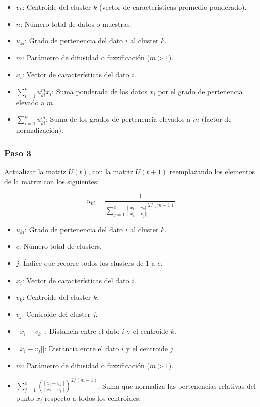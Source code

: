\documentclass[11pt, letterpaper]{article}
\begin{document}
\begin{itemize}
	\item $v_k$: Centroide del cluster $k$ (vector de características promedio ponderado).
	\item $n$: Número total de datos o muestras.
	\item $u_{ki}$: Grado de pertenencia del dato $i$ al cluster $k$.
	\item $m$: Parámetro de difusidad o fuzzificación ($m > 1$).
	\item $x_i$: Vector de características del dato $i$.
	\item $\sum_{i=1}^{n} u_{ki}^m x_i$: Suma ponderada de los datos $x_i$ por el grado de pertenencia elevado a $m$.
	\item $\sum_{i=1}^{n} u_{ki}^m$: Suma de los grados de pertenencia elevados a $m$ (factor de normalización).
\end{itemize}


\subsubsection{Paso 3}

Actualizar la matriz $U(t) $, con la matriz $U(t + 1)$ reemplazando los elementos de la matriz con los siguientes:

$$u_{ki} = \frac{1}{\sum^c_{j = 1}{\frac{||x_i-v_k||}{||x_i-v_j||}}^{2/(m-1)}}$$

\begin{itemize}
	\item $u_{ki}$: Grado de pertenencia del dato $i$ al cluster $k$.
	\item $c$: Número total de clusters.
	\item $j$: Índice que recorre todos los clusters de $1$ a $c$.
	\item $x_i$: Vector de características del dato $i$.
	\item $v_k$: Centroide del cluster $k$.
	\item $v_j$: Centroide del cluster $j$.
	\item $||x_i - v_k||$: Distancia entre el dato $i$ y el centroide $k$.
	\item $||x_i - v_j||$: Distancia entre el dato $i$ y el centroide $j$.
	\item $m$: Parámetro de difusidad o fuzzificación ($m > 1$).
	\item $\sum_{j=1}^{c} \left( \frac{||x_i - v_k||}{||x_i - v_j||} \right)^{2/(m-1)}$: Suma que normaliza las pertenencias relativas del punto $x_i$ respecto a todos los centroides.
\end{itemize}
\end{document}
